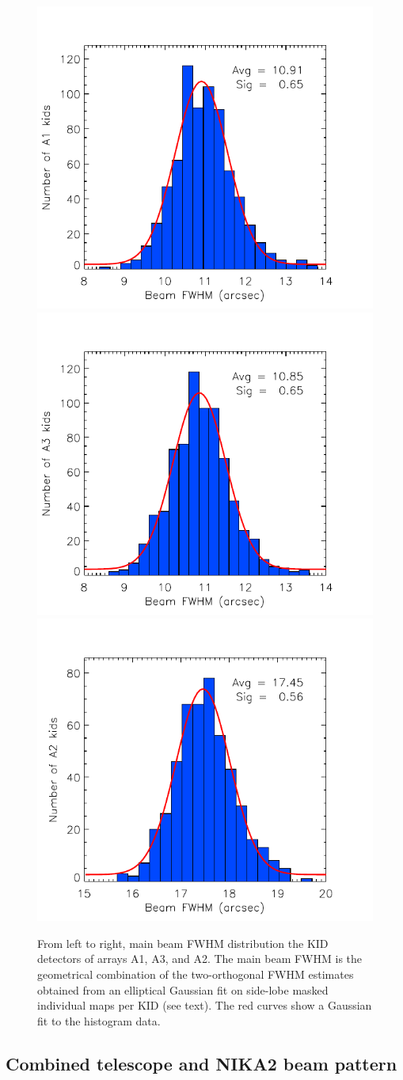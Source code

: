 \documentclass[]{aa} %
\begin{document}
\begin{figure}[h]
  \centering
  \includegraphics[clip=true,width=0.33\linewidth]{plot_histo_A1_fwhm_20170424s123.pdf}
  \includegraphics[clip=true,width=0.33\linewidth]{plot_histo_A3_fwhm_20170424s123.pdf}
  \includegraphics[clip=true,width=0.33\linewidth]{plot_histo_A2_fwhm_20170424s123.pdf}
  
\caption{From left to right, main beam FWHM distribution the KID detectors of arrays A1, A3, and A2. The main beam FWHM is the geometrical combination of the two-orthogonal FWHM estimates obtained from an elliptical Gaussian fit on side-lobe masked individual maps per KID (see text). The red curves show a Gaussian fit to the histogram data.}
  \label{fig:focalplane_histo}
\end{figure}

\subsection{Combined telescope and NIKA2 beam pattern}
\end{document}
